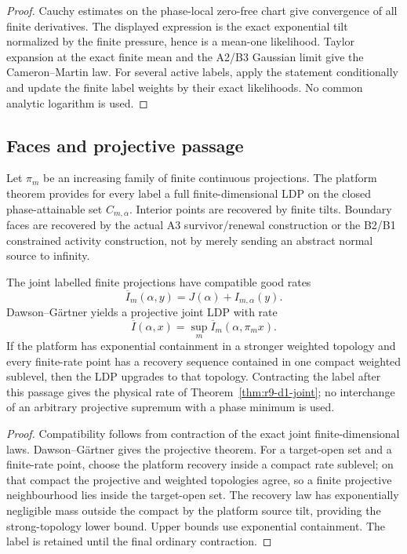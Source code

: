 \begin{proof}
Cauchy estimates on the phase-local zero-free chart give convergence of all
finite derivatives.  The displayed expression is the exact exponential tilt
normalized by the finite pressure, hence is a mean-one likelihood.  Taylor
expansion at the exact finite mean and the A2/B3 Gaussian limit give the
Cameron--Martin law.  For several active labels, apply the statement
conditionally and update the finite label weights by their exact likelihoods.
No common analytic logarithm is used.
\end{proof}

\subsection{Faces and projective passage}

Let $\pi_m$ be an increasing family of finite continuous projections.  The
platform theorem provides for every label a full finite-dimensional LDP on the
closed phase-attainable set $C_{m,\alpha}$.  Interior points are recovered by
finite tilts.  Boundary faces are recovered by the actual A3 survivor/renewal
construction or the B2/B1 constrained activity construction, not by merely
sending an abstract normal source to infinity.

\begin{theorem}
\label{thm:r9-d1-projective}
The joint labelled finite projections have compatible good rates
\[
 \overline I_m(\alpha,y)
 =J(\alpha)+I_{m,\alpha}(y).
\]
Dawson--G\"artner yields a projective joint LDP with rate
\[
 \overline I(\alpha,x)=
 \sup_m\overline I_m(\alpha,\pi_mx).
\]
If the platform has exponential containment in a stronger weighted topology
and every finite-rate point has a recovery sequence contained in one compact
weighted sublevel, then the LDP upgrades to that topology.  Contracting the
label after this passage gives the physical rate of
Theorem~\ref{thm:r9-d1-joint}; no interchange of an arbitrary projective
supremum with a phase minimum is used.
\end{theorem}

\begin{proof}
Compatibility follows from contraction of the exact joint finite-dimensional
laws.  Dawson--G\"artner gives the projective theorem.  For a target-open set
and a finite-rate point, choose the platform recovery inside a compact rate
sublevel; on that compact the projective and weighted topologies agree, so a
finite projective neighbourhood lies inside the target-open set.  The recovery
law has exponentially negligible mass outside the compact by the platform
source tilt, providing the strong-topology lower bound.  Upper bounds use
exponential containment.  The label is retained until the final ordinary
contraction.
\end{proof}

